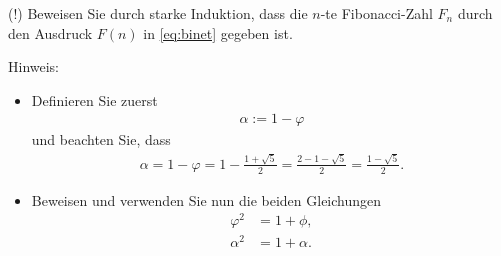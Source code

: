 \clearpage
\begin{myexercise}\label{myexercise:0477}
	(!) Beweisen Sie durch starke Induktion, dass die $n$-te Fibonacci-Zahl $F_n$ durch den Ausdruck $F(n)$ in \cref{eq:binet} gegeben ist.

	\noindent
	Hinweis:
	\begin{itemize}
		\item Definieren Sie zuerst
		      \begin{align*}
			      \alpha := 1-\varphi
		      \end{align*}
		      und beachten Sie, dass
		      \begin{align*}
			      \alpha = 1-\varphi = 1 - \frac{1+\sqrt{5}}{2} = \frac{2 - 1 - \sqrt{5}}{2} =  \frac{1-\sqrt{5}}{2}.
		      \end{align*}
		\item Beweisen und verwenden Sie nun die beiden Gleichungen
		      \begin{align*}
			      \varphi^2 & = 1+\phi,   \\
			      \alpha^2  & = 1+\alpha.
		      \end{align*}
	\end{itemize}
\end{myexercise}

